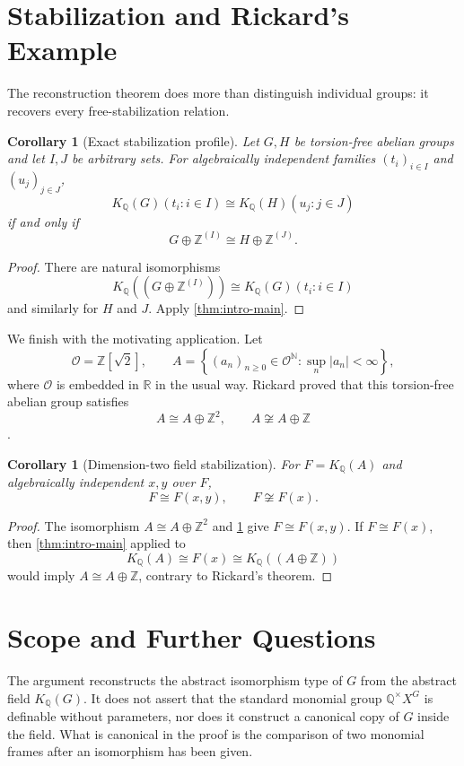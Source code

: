 \documentclass[11pt,a4paper]{article}
\numberwithin{equation}{section}
\theoremstyle{plain}
\newtheorem{corollary}[theorem]{Corollary}
\theoremstyle{definition}
\theoremstyle{remark}
\newcommand{\Q}{\mathbb Q}
\newcommand{\Z}{\mathbb Z}
\newcommand{\N}{\mathbb N}
\newcommand{\KQ}[1]{K_{\Q}(#1)}
\begin{document}
\section{Stabilization and Rickard's Example}\label{sec:applications}

The reconstruction theorem does more than distinguish individual groups: it
recovers every free-stabilization relation.

\begin{corollary}[Exact stabilization profile]\label{cor:stabilization}
Let $G,H$ be torsion-free abelian groups and let $I,J$ be arbitrary sets.
For algebraically independent families $(t_i)_{i\in I}$ and
$(u_j)_{j\in J}$,
\[
  \KQ G(t_i:i\in I)\cong\KQ H(u_j:j\in J)
\]
if and only if
\[
  G\oplus\Z^{(I)}\cong H\oplus\Z^{(J)}.
\]
\end{corollary}

\begin{proof}
There are natural isomorphisms
\[
  \KQ{(G\oplus\Z^{(I)})}\cong\KQ G(t_i:i\in I)
\]
and similarly for $H$ and $J$.  Apply \cref{thm:intro-main}.
\end{proof}

We finish with the motivating application.  Let
\[
  \mathcal O=\Z[\sqrt2],
  \qquad
  A=\left\{(a_n)_{n\geq0}\in\mathcal O^{\N}:
  \sup_n|a_n|<\infty\right\},
\]
where $\mathcal O$ is embedded in $\mathbb R$ in the usual way.  Rickard
proved that this torsion-free abelian group satisfies
\[
  A\cong A\oplus\Z^2,
  \qquad
  A\not\cong A\oplus\Z
\]
\cite{Rickard2020}.

\begin{corollary}[Dimension-two field stabilization]\label{cor:field-example}
For $F=\KQ A$ and algebraically independent $x,y$ over $F$,
\[
  F\cong F(x,y),
  \qquad
  F\not\cong F(x).
\]
\end{corollary}

\begin{proof}
The isomorphism $A\cong A\oplus\Z^2$ and
\cref{cor:stabilization} give $F\cong F(x,y)$.  If $F\cong F(x)$, then
\cref{thm:intro-main} applied to
\[
  \KQ A\cong F(x)\cong\KQ{(A\oplus\Z)}
\]
would imply $A\cong A\oplus\Z$, contrary to Rickard's theorem.
\end{proof}

\section{Scope and Further Questions}

The argument reconstructs the abstract isomorphism type of $G$ from the
abstract field $\KQ G$.  It does not assert that the standard monomial group
$\Q^\times X^G$ is definable without parameters, nor does it construct a
canonical copy of $G$ inside the field.  What is canonical in the proof is
the comparison of two monomial frames after an isomorphism has been given.
\end{document}
